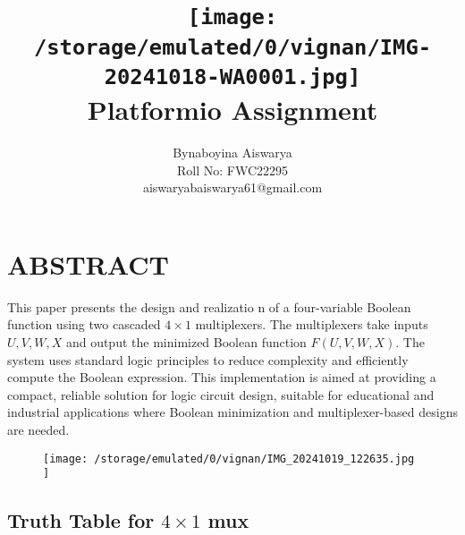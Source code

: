 \documentclass[conference]{IEEEtran}
\title{
\vspace{1cm}
{\texttt{[image:  /storage/emulated/0/vignan/IMG-20241018-WA0001.jpg]} \\ Platformio Assignment}}
\author{Bynaboyina Aiswarya \\ Roll No: FWC22295 \\ aiswaryabaiswarya61@gmail.com}
\begin{document}
\maketitle
 \section{ABSTRACT}

This paper presents the design and realizatio    n of a four-variable Boolean function using two cascaded $4 \times 1$ multiplexers. The multiplexers take inputs \( U, V, W, X \) and output the minimized Boolean function \( F(U, V, W, X)\).                                       The system uses standard logic principles to     reduce complexity and efficiently compute the     Boolean expression. This implementation is aimed at providing a compact, reliable solution for logic circuit design, suitable for educational and industrial applications where Boolean minimization and multiplexer-based designs are needed.

\begin{figure}[h]                          
	\centering
\texttt{[image:   /storage/emulated/0/vignan/IMG\_20241019\_122635.jpg ]}
\caption{\label{fig:Gates}}                
\end{figure}


\subsection{Truth Table for $4 \times 1$ mux}
\end{document}
